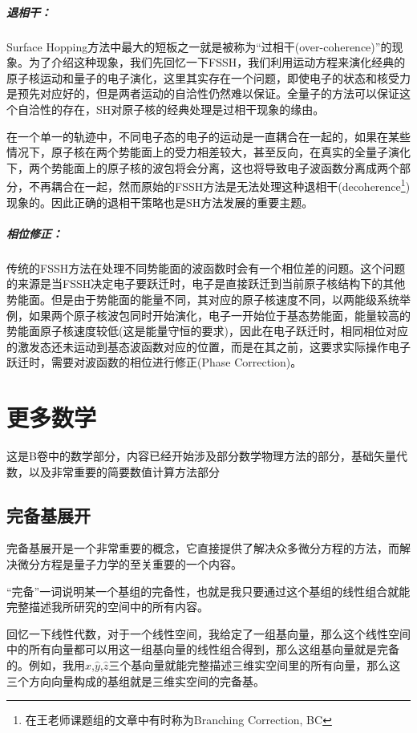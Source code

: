 \documentclass[12pt,a4paper,openany,twoside]{book}
\numberwithin{equation}{section}
\begin{document}
        \paragraph{退相干：}Surface Hopping方法中最大的短板之一就是被称为“过相干(over-coherence)”的现象。为了介绍这种现象，我们先回忆一下FSSH，我们利用运动方程来演化经典的原子核运动和量子的电子演化，这里其实存在一个问题，即使电子的状态和核受力是预先对应好的，但是两者运动的自洽性仍然难以保证。全量子的方法可以保证这个自洽性的存在，SH对原子核的经典处理是过相干现象的缘由。

        在一个单一的轨迹中，不同电子态的电子的运动是一直耦合在一起的，如果在某些情况下，原子核在两个势能面上的受力相差较大，甚至反向，在真实的全量子演化下，两个势能面上的原子核的波包将会分离，这也将导致电子波函数分离成两个部分，不再耦合在一起，然而原始的FSSH方法是无法处理这种退相干(decoherence\footnote{在王老师课题组的文章中有时称为Branching Correction, BC})现象的。因此正确的退相干策略也是SH方法发展的重要主题。
        
        \paragraph{相位修正：}传统的FSSH方法在处理不同势能面的波函数时会有一个相位差的问题。这个问题的来源是当FSSH决定电子要跃迁时，电子是直接跃迁到当前原子核结构下的其他势能面。但是由于势能面的能量不同，其对应的原子核速度不同，以两能级系统举例，如果两个原子核波包同时开始演化，电子一开始位于基态势能面，能量较高的势能面原子核速度较低(这是能量守恒的要求)，因此在电子跃迁时，相同相位对应的激发态还未运动到基态波函数对应的位置，而是在其之前，这要求实际操作电子跃迁时，需要对波函数的相位进行修正(Phase Correction)。

    \chapter{更多数学}
      这是B卷中的数学部分，内容已经开始涉及部分数学物理方法的部分，基础矢量代数，以及非常重要的简要数值计算方法部分
      \section{完备基展开}
    \label{expansion_of_complete_basis}
    完备基展开是一个非常重要的概念，它直接提供了解决众多微分方程的方法，而解决微分方程是量子力学的至关重要的一个内容。

    “完备”一词说明某一个基组的完备性，也就是我只要通过这个基组的线性组合就能完整描述我所研究的空间中的所有内容。
    
    回忆一下线性代数，对于一个线性空间，我给定了一组基向量，那么这个线性空间中的所有向量都可以用这一组基向量的线性组合得到，那么这组基向量就是完备的。例如，我用$\hat{x}$,$\hat{y}$,$\hat{z}$三个基向量就能完整描述三维实空间里的所有向量，那么这三个方向向量构成的基组就是三维实空间的完备基。
    
\end{document}
